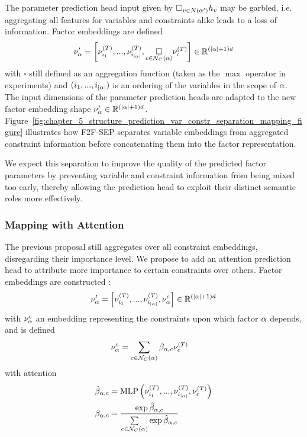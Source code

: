The parameter prediction head input given by $\square_{v \in N(\alpha')} h_v$ may be garbled, i.e. aggregating all features for variables and constraints alike leads to a loss of information. Factor embeddings are defined
\begin{equation}
    \nu'_{\alpha} = \left[ \nu^{(T)}_{i_1},...,\nu^{(T)}_{i_{|\alpha|}}, \underset{c \in \mathcal{N}_C(\alpha)}{\square} \nu^{(T)}_{c} \right] \in \mathbb{R}^{(|\alpha| + 1) d}
\end{equation}
with $\square $ still defined as an aggregation function (taken as the $\max$ operator in experiments) and $(i_1,...,i_{|\alpha|})$ is an ordering of the variables in the scope of $\alpha$. The input dimensions of the parameter prediction heads are adapted to the new factor embedding shape $\nu'_{\alpha} \in \mathbb{R}^{(|\alpha|+1) d}$. Figure~\ref{fig:chapter_5_structure_prediction_var_constr_separation_mapping_figure} illustrates how F2F-SEP separates variable embeddings from aggregated constraint information before concatenating them into the factor representation.

We expect this separation to improve the quality of the predicted factor parameters by preventing variable and constraint information from being mixed too early, thereby allowing the prediction head to exploit their distinct semantic roles more effectively.



\subsubsection{Mapping with Attention}
The previous proposal still aggregates over all constraint embeddings, disregarding their importance level. We propose to add an attention prediction head to attribute more importance to certain constraints over others. Factor embeddings are constructed :
\begin{equation}
    \nu'_{\alpha} = \left[ \nu^{(T)}_{i_1},...,\nu^{(T)}_{i_{|\alpha|}}, \nu^c_{\alpha} \right] \in \mathbb{R}^{(|\alpha| + 1) d}
\end{equation}
with $\nu^c_{\alpha}$ an embedding representing the constraints upon which factor $\alpha$ depends, and is defined
\begin{align}
    \nu^c_{\alpha} &= \sum\limits_{c \in \mathcal{N}_C(\alpha)} \beta_{\alpha,c} \nu^{(T)}_{c}
\end{align}
with attention 
\begin{align}
    \hat{\beta}_{\alpha,c} &=  \operatorname{MLP} \left(  \nu^{(T)}_{i_1},...,\nu^{(T)}_{i_{|\alpha|}}, \nu^{(T)}_{c} \right) \\
    \beta_{\alpha,c} &= \frac{\exp \hat{\beta}_{\alpha,c}}{\sum\limits_{c \in \mathcal{N}_C(\alpha)} \exp \hat{\beta}_{\alpha,c}}
\end{align}

